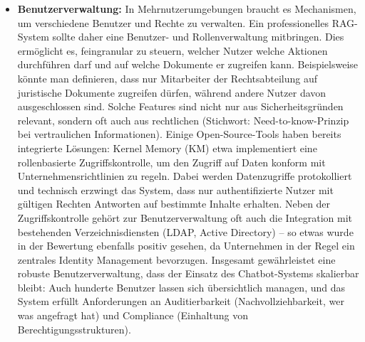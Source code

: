 \begin{itemize}
    \item \textbf{Benutzerverwaltung:} In Mehrnutzerumgebungen braucht es Mechanismen, um verschiedene Benutzer und Rechte zu verwalten. Ein professionelles RAG-System sollte daher eine Benutzer- und Rollenverwaltung mitbringen. Dies ermöglicht es, feingranular zu steuern, welcher Nutzer welche Aktionen durchführen darf und auf welche Dokumente er zugreifen kann. Beispielsweise könnte man definieren, dass nur Mitarbeiter der Rechtsabteilung auf juristische Dokumente zugreifen dürfen, während andere Nutzer davon ausgeschlossen sind. Solche Features sind nicht nur aus Sicherheitsgründen relevant, sondern oft auch aus rechtlichen (Stichwort: Need-to-know-Prinzip bei vertraulichen Informationen). Einige Open-Source-Tools haben bereits integrierte Lösungen: Kernel Memory (KM) etwa implementiert eine rollenbasierte Zugriffskontrolle, um den Zugriff auf Daten konform mit Unternehmensrichtlinien zu regeln. Dabei werden Datenzugriffe protokolliert und technisch erzwingt das System, dass nur authentifizierte Nutzer mit gültigen Rechten Antworten auf bestimmte Inhalte erhalten. Neben der Zugriffskontrolle gehört zur Benutzerverwaltung oft auch die Integration mit bestehenden Verzeichnisdiensten (LDAP, Active Directory) – so etwas wurde in der Bewertung ebenfalls positiv gesehen, da Unternehmen in der Regel ein zentrales Identity Management bevorzugen. Insgesamt gewährleistet eine robuste Benutzerverwaltung, dass der Einsatz des Chatbot-Systems skalierbar bleibt: Auch hunderte Benutzer lassen sich übersichtlich managen, und das System erfüllt Anforderungen an Auditierbarkeit (Nachvollziehbarkeit, wer was angefragt hat) und Compliance (Einhaltung von Berechtigungsstrukturen).

\end{itemize}
